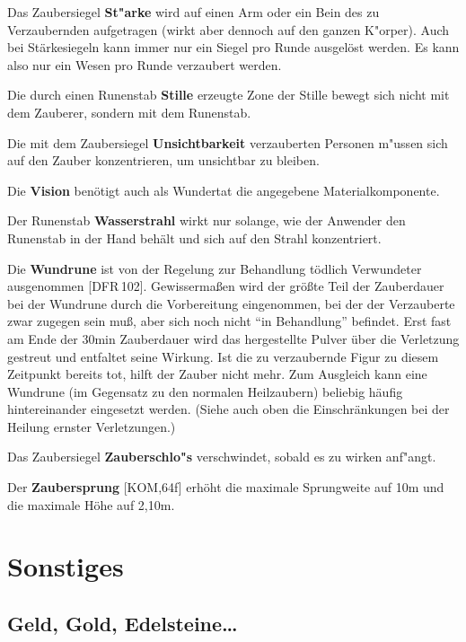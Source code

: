 \documentclass[10pt,a4paper,germanpar]{article}
\begin{document}
Das Zaubersiegel \textbf{St"arke} wird auf einen Arm oder ein Bein des
zu Verzaubernden aufgetragen (wirkt aber dennoch auf den ganzen
K"orper). Auch bei Stärkesiegeln kann immer nur ein Siegel pro Runde
ausgelöst werden. Es kann also nur ein Wesen pro Runde verzaubert
werden.

Die durch einen Runenstab \textbf{Stille} erzeugte Zone der Stille
bewegt sich nicht mit dem Zauberer, sondern mit dem Runenstab.

%

Die mit dem Zaubersiegel \textbf{Unsichtbarkeit} verzauberten Personen 
m"ussen sich auf den Zauber konzentrieren, um unsichtbar zu bleiben.

Die \textbf{Vision} benötigt auch als Wundertat die angegebene
Materialkomponente.

Der Runenstab \textbf{Wasserstrahl} wirkt nur solange, wie der
Anwender den Runenstab in der Hand behält und sich auf den Strahl
konzentriert.

Die \textbf{Wundrune} ist von der Regelung zur Behandlung tödlich
Verwundeter ausgenommen [DFR\,102]. Gewissermaßen wird der größte Teil
der Zauberdauer bei der Wundrune durch die Vorbereitung eingenommen,
bei der der Verzauberte zwar zugegen sein muß, aber sich noch nicht
"`in Behandlung"' befindet. Erst fast am Ende der 30min Zauberdauer
wird das hergestellte Pulver über die Verletzung gestreut und
entfaltet seine Wirkung. Ist die zu verzaubernde Figur zu diesem
Zeitpunkt bereits tot, hilft der Zauber nicht mehr. Zum Ausgleich kann
eine Wundrune (im Gegensatz zu den normalen Heilzaubern) beliebig
häufig hintereinander eingesetzt werden. (Siehe auch oben die
Einschränkungen bei der Heilung ernster Verletzungen.)

Das Zaubersiegel \textbf{Zauberschlo"s} verschwindet, sobald es zu
wirken anf"angt.

Der \textbf{Zaubersprung} [KOM,64f] erhöht die maximale Sprungweite
auf 10m und die maximale Höhe auf 2,10m.

\section{Sonstiges}

\subsection{Geld, Gold, Edelsteine\dots}
\end{document}
